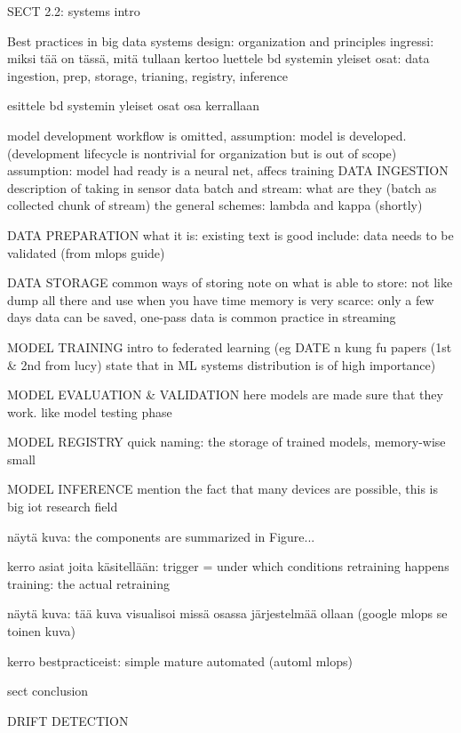 SECT 2.2: systems intro

Best practices in big data systems design: organization and principles
ingressi: miksi tää on tässä, mitä tullaan kertoo
luettele bd systemin yleiset osat: data ingestion, prep, storage, trianing, registry, inference

esittele bd systemin yleiset osat osa kerrallaan

	model development workflow is omitted, assumption: model is developed. (development lifecycle is nontrivial for organization but is out of scope) assumption: model had ready is a neural net, affecs training
	DATA INGESTION
	description of taking in sensor data
	batch and stream: what are they (batch as collected chunk of stream)
	the general schemes: lambda and kappa (shortly)

	DATA PREPARATION
	what it is: existing text is good
	include: data needs to be validated (from mlops guide)

	DATA STORAGE
	common ways of storing
	note on what is able to store: 
		not like dump all there and use when you have time
		memory is very scarce: only a few days data can be saved, one-pass data is common practice in streaming
		
	MODEL TRAINING
	intro to federated learning
	(eg DATE n kung fu papers (1st & 2nd from lucy) state that in ML systems distribution is of high importance)
	
	MODEL EVALUATION & VALIDATION
	here models are made sure that they work. like model testing phase

	MODEL REGISTRY
	quick naming: the storage of trained models, memory-wise small

	MODEL INFERENCE
	mention the fact that many devices are possible, this is big iot research field

näytä kuva: the components are summarized in Figure...

kerro asiat joita käsitellään: trigger = under which conditions retraining happens
training: the actual retraining

näytä kuva: tää kuva visualisoi missä osassa järjestelmää ollaan (google mlops se toinen kuva)

kerro bestpracticeist: simple mature automated (automl mlops)

sect conclusion

DRIFT DETECTION


